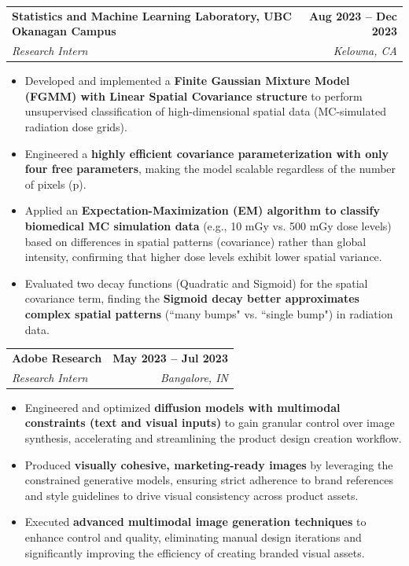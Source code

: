 \documentclass[letterpaper,11pt]{article}
\makeatletter
\newcommand{\resumeItem}[1]{
  \item\small{
    {#1 \vspace{-2pt}}
  }
}
\newcommand{\resumeSubheading}[4]{
  \vspace{-2pt}\item
    \begin{tabular*}{1.0\textwidth}[t]{l@{\extracolsep{\fill}}r}
      \textbf{#1} & \textbf{\small #2} \\
      \textit{\small#3} & \textit{\small #4} \\
    \end{tabular*}\vspace{-7pt}
}
\newcommand{\resumeItemListStart}{\begin{itemize}}
\newcommand{\resumeItemListEnd}{\end{itemize}\vspace{-5pt}}
\makeatother
\begin{document}
\resumeSubheading
{Statistics and Machine Learning Laboratory, UBC Okanagan Campus \href{https://drive.google.com/file/d/1Rt6sj3cNurPYabwLlw6IlGi88XK0PWEo/view?usp=sharing}{\raisebox{-0.2\height}\faExternalLink}}{Aug 2023 -- Dec 2023}
{Research Intern}{Kelowna, CA}
\resumeItemListStart
\resumeItem{Developed and implemented a \textbf{Finite Gaussian Mixture Model (FGMM) with Linear Spatial Covariance structure} to perform unsupervised classification of high-dimensional spatial data (MC-simulated radiation dose grids).}
\resumeItem{Engineered a \textbf{highly efficient covariance parameterization with only four free parameters}, making the model scalable regardless of the number of pixels (p).}
\resumeItem{Applied an \textbf{Expectation-Maximization (EM) algorithm to classify biomedical MC simulation data} (e.g., 10 mGy vs. 500 mGy dose levels) based on differences in spatial patterns (covariance) rather than global intensity, confirming that higher dose levels exhibit lower spatial variance.}
\resumeItem{Evaluated two decay functions (Quadratic and Sigmoid) for the spatial covariance term, finding the \textbf{Sigmoid decay better approximates complex spatial patterns} (``many bumps" vs. ``single bump") in radiation data.}
\resumeItemListEnd

\resumeSubheading
{Adobe Research \href{https://drive.google.com/file/d/1CyZFnXeJqNbwFSd9rFtHVOSS2556KXTW/view?usp=sharing}{\raisebox{-0.2\height}\faExternalLink}}{May 2023 -- Jul 2023}
{Research Intern}{Bangalore, IN}
\resumeItemListStart
\resumeItem{Engineered and optimized \textbf{diffusion models with multimodal constraints (text and visual inputs)} to gain granular control over image synthesis, accelerating and streamlining the product design creation workflow.}
\resumeItem{Produced \textbf{visually cohesive, marketing-ready images} by leveraging the constrained generative models, ensuring strict adherence to brand references and style guidelines to drive visual consistency across product assets.}
\resumeItem{Executed \textbf{advanced multimodal image generation techniques} to enhance control and quality, eliminating manual design iterations and significantly improving the efficiency of creating branded visual assets.}
\resumeItemListEnd
\end{document}
